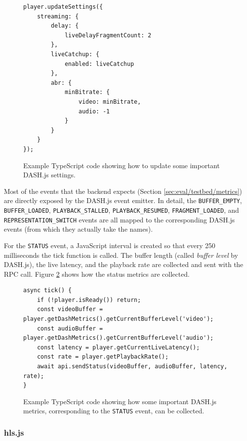 \begin{figure}[h]
    \centering
    \begin{verbatim}
player.updateSettings({
    streaming: {
        delay: {
            liveDelayFragmentCount: 2
        },
        liveCatchup: {
            enabled: liveCatchup
        },
        abr: {
            minBitrate: {
                video: minBitrate,
                audio: -1
            }
        }
    }
});
    \end{verbatim}
    \caption{Example TypeScript code showing how to update some important DASH.js settings.}
    \label{fig:dashjs_settings}
\end{figure}

Most of the events that the backend expects (Section \ref{sec:eval/testbed/metrics}) are directly exposed by the DASH.js event emitter. In detail, the \texttt{BUFFER\_EMPTY}, \texttt{BUFFER\_LOADED}, \texttt{PLAYBACK\_STALLED}, \texttt{PLAYBACK\_RESUMED}, \texttt{FRAGMENT\_LOADED}, and \texttt{REPRESENTATION\_SWITCH} events are all mapped to the corresponding DASH.js events (from which they actually take the names).

For the \texttt{STATUS} event, a JavaScript interval is created so that every 250 milliseconds the tick function is called. The buffer length (called \textit{buffer level} by DASH.js), the live latency, and the playback rate are collected and sent with the RPC call. Figure \ref{fig:dashjs_tick} shows how the status metrics are collected.

\begin{figure}[h]
    \centering
    \begin{verbatim}
async tick() {
    if (!player.isReady()) return;
    const videoBuffer = player.getDashMetrics().getCurrentBufferLevel('video');
    const audioBuffer = player.getDashMetrics().getCurrentBufferLevel('audio');
    const latency = player.getCurrentLiveLatency();
    const rate = player.getPlaybackRate();
    await api.sendStatus(videoBuffer, audioBuffer, latency, rate);
}
    \end{verbatim}
    \caption{Example TypeScript code showing how some important DASH.js metrics, corresponding to the \texttt{STATUS} event, can be collected.}
    \label{fig:dashjs_tick}
\end{figure}

\subsubsection{hls.js}
\label{sec:eval/testbed/frontend/hlsjs}

